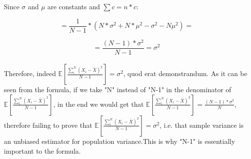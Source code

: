 \documentclass{article}
\begin{document}
Since $\sigma$ and $\mu$ are constants and $\sum c = n*c$:

$$=\frac{1}{N-1} * (N*\sigma^2 + N*\mu^2 - \sigma^2 - N\mu^2)=$$

$$=\frac{(N-1)*\sigma^2}{N-1}=\sigma^2$$
\\

Therefore, indeed $\mathbb{E}[ \frac{\sum_i^N (X_i - \bar{X})^2}{N-1} ]=\sigma^2$, quod erat demonstrandum. As it can be seen from the formula, if we take "N" instead of "N-1" in the denominator of $\mathbb{E}[ \frac{\sum_i^N (X_i - \bar{X})^2}{N-1} ]$, in the end we would get that $\mathbb{E}[ \frac{\sum_i^N (X_i - \bar{X})^2}{N-1} ]=\frac{(N-1)*\sigma^2}{N}$, therefore failing to prove that $\mathbb{E}[ \frac{\sum_i^N (X_i - \bar{X})^2}{N-1} ]=\sigma^2$, i.e. that sample variance is an unbiased estimator for population variance.This is why "N-1" is essentially important to the formula. 
\end{document}
